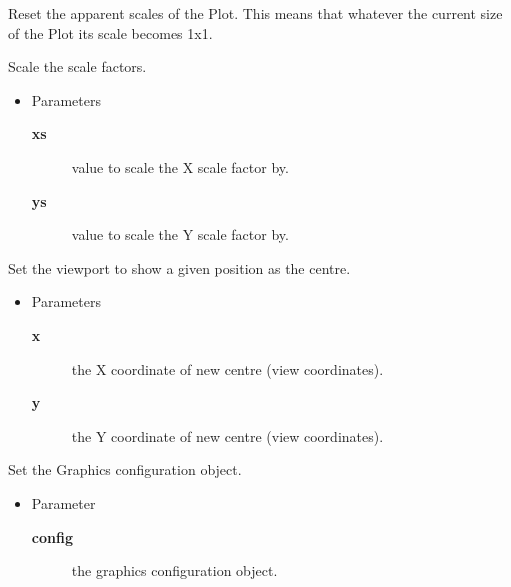 \begin{desc}Reset the apparent scales of the Plot. This means that
 whatever the current size of the Plot its scale becomes 1x1.
\end{desc}

\begin{desc}Scale the scale factors.
\begin{itemize}
\item{Parameters
  \begin{description}
   \item[\textbf{xs}]{value to scale the X scale factor by.}
   \item[\textbf{ys}]{value to scale the Y scale factor by.}
  \end{description}}
\end{itemize}
\end{desc}

\begin{desc}Set the viewport to show a given position as the centre.
\begin{itemize}
\item{Parameters
  \begin{description}
   \item[\textbf{x}]{the X coordinate of new centre (view coordinates).}
   \item[\textbf{y}]{the Y coordinate of new centre (view coordinates).}
  \end{description}}
\end{itemize}
\end{desc}

\begin{desc}Set the Graphics configuration object.
\begin{itemize}
\item{Parameter
  \begin{description}
   \item[\textbf{config}]{the graphics configuration object.}
  \end{description}}
\end{itemize}
\end{desc}

